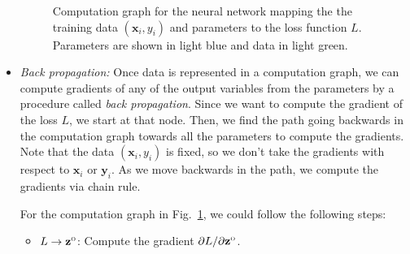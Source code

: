 \documentclass[11pt]{article}
\def\arr{\rightarrow}
\newcommand{\bbf}{\mathbf{b}}
\newcommand{\ubf}{\mathbf{u}}
\newcommand{\xbf}{\mathbf{x}}
\newcommand{\ybf}{\mathbf{y}}
\newcommand{\zbf}{\mathbf{z}}
\newcommand{\Wbf}{\mathbf{W}}
\def\hid{\textsc{\tiny H}}
\def\out{\textsc{\tiny O}}
\begin{document}
\begin{itemize}
\begin{figure}
\center
{}
\caption{Computation graph for the neural network mapping the the training data $(\xbf_i,y_i)$
and parameters to the loss function $L$.  Parameters are shown in light blue
and data in light green.}
\label{fig:compgraph}
\end{figure}

\item \emph{Back propagation:}
Once data is represented in a computation graph, we can compute
gradients of any of the output variables from the parameters
by a procedure called \emph{back propagation}.
Since we want to compute the gradient of the loss $L$, we start
at that node.  Then, we find the path going backwards in the
computation graph towards all the parameters to compute the gradients.
Note that the data $(\xbf_i,y_i)$ is fixed, so we don't take the gradients with respect to $\xbf_i$ or $\ybf_i$.  As we move backwards in the path,
we compute the gradients via chain rule.

For the computation graph in Fig.~\ref{fig:compgraph}, we could follow the following steps:
\begin{itemize}
\item $L \arr \zbf^\out$:  Compute the gradient $\partial L/\partial \zbf^\out$.


\end{itemize}
\end{itemize}
\end{document}
